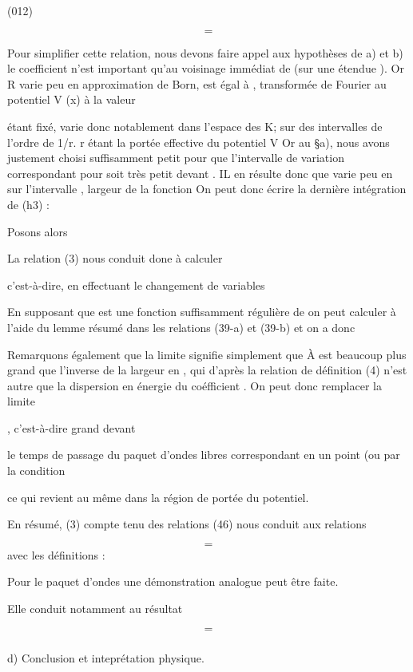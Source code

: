 %
(012)

\[
\tag{45}=
\]


Pour simplifier cette relation, nous devons faire appel aux hypothèses
de a) et b)  le coefficient  n'est important qu'au voisinage
immédiat de  (sur une étendue ). Or R  varie peu en
 approximation de Born,  est égal
à , transformée de Fourier au potentiel V (x) à la valeur

 étant fixé,  varie donc notablement dans
l'espace des K; sur des intervalles de l'ordre de 1/r. r étant la portée
effective du potentiel V Or au \S a), nous avons justement choisi 
suffisamment petit pour que l'intervalle de variation correspondant pour
 soit très petit devant . IL en résulte donc que 
varie peu en  sur l'intervalle , largeur de la fonction  On
peut donc écrire la dernière intégration de (h3) :

Posons alors

La relation (3) nous conduit done à calculer

c'est-à-dire, en effectuant le changement de variables 

En supposant que  est une fonction suffisamment régulière
de  on peut calculer  à l'aide du lemme résumé dans les
relations (39-a) et (39-b) et on a donc


Remarquons également que la limite  signifie simplement que À
est beaucoup plus grand que l'inverse de la largeur en ,
qui d'après la relation de définition (4) n'est autre que la dispersion en
énergie  du coéfficient . On peut donc remplacer la limite

, c'est-à-dire  grand devant

le temps de passage du paquet d'ondes libres correspondant en un point (ou
 par la condition

ce qui revient au même dans la région de portée du potentiel.

En résumé, (3) compte tenu des relations (46) nous conduit aux
relations

\[
\tag{472}=
\]
avec les définitions :

Pour le paquet d'ondes  une démonstration analogue peut être faite.

Elle conduit notamment au résultat

\[
\tag{48}=
\]

\subsubsection{}%
d) Conclusion et inteprétation physique.

